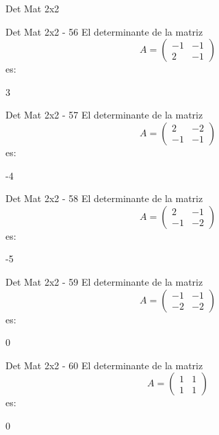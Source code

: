\documentclass[a4,11pt]{aleph-notas}
\begin{document}
\begin{quiz}{Det Mat 2x2}
\begin{numerical}[tolerance=0]%
    {Det Mat 2x2 - 56}
    El determinante de la matriz
    \[
        A = \begin{pmatrix} -1 & -1 \\ 2 & -1 \end{pmatrix}
    \]
    es:
    \item[] 3
\end{numerical}

\begin{numerical}[tolerance=0]%
    {Det Mat 2x2 - 57}
    El determinante de la matriz
    \[
        A = \begin{pmatrix} 2 & -2 \\ -1 & -1 \end{pmatrix}
    \]
    es:
    \item[] -4
\end{numerical}

\begin{numerical}[tolerance=0]%
    {Det Mat 2x2 - 58}
    El determinante de la matriz
    \[
        A = \begin{pmatrix} 2 & -1 \\ -1 & -2 \end{pmatrix}
    \]
    es:
    \item[] -5
\end{numerical}

\begin{numerical}[tolerance=0]%
    {Det Mat 2x2 - 59}
    El determinante de la matriz
    \[
        A = \begin{pmatrix} -1 & -1 \\ -2 & -2 \end{pmatrix}
    \]
    es:
    \item[] 0
\end{numerical}

\begin{numerical}[tolerance=0]%
    {Det Mat 2x2 - 60}
    El determinante de la matriz
    \[
        A = \begin{pmatrix} 1 & 1 \\ 1 & 1 \end{pmatrix}
    \]
    es:
    \item[] 0
\end{numerical}


\end{quiz}
\end{document}
